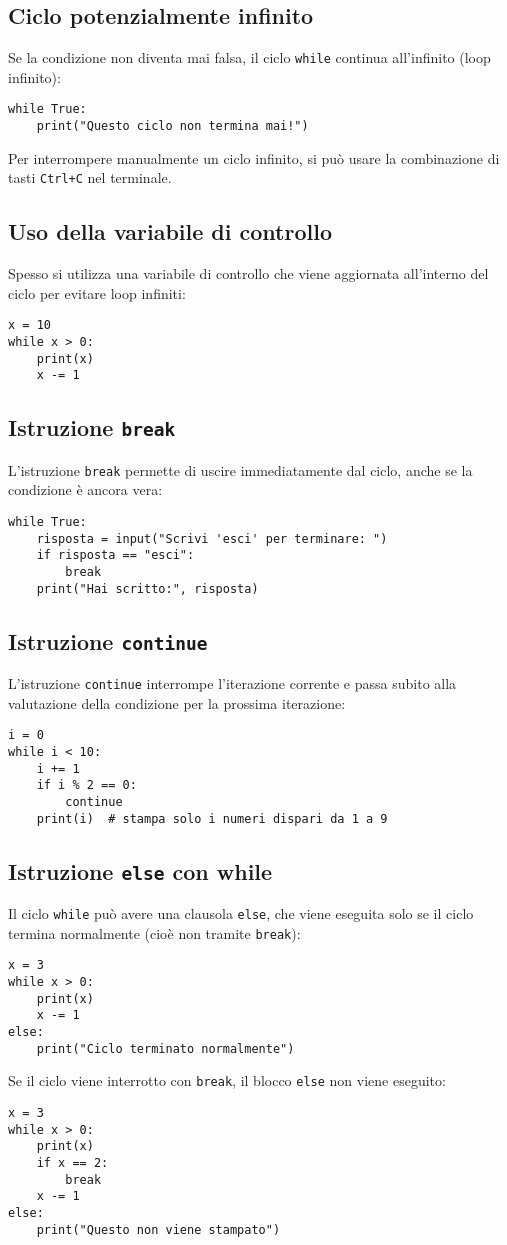 \documentclass[a4paper,12pt]{article}
\begin{document}
\subsection*{Ciclo potenzialmente infinito}
Se la condizione non diventa mai falsa, il ciclo \texttt{while} continua all'infinito (loop infinito):
\begin{lstlisting}
while True:
    print("Questo ciclo non termina mai!")
\end{lstlisting}
Per interrompere manualmente un ciclo infinito, si può usare la combinazione di tasti \texttt{Ctrl+C} nel terminale.

\subsection*{Uso della variabile di controllo}
Spesso si utilizza una variabile di controllo che viene aggiornata all'interno del ciclo per evitare loop infiniti:
\begin{lstlisting}
x = 10
while x > 0:
    print(x)
    x -= 1
\end{lstlisting}

\subsection*{Istruzione \texttt{break}}
L'istruzione \texttt{break} permette di uscire immediatamente dal ciclo, anche se la condizione è ancora vera:
\begin{lstlisting}
while True:
    risposta = input("Scrivi 'esci' per terminare: ")
    if risposta == "esci":
        break
    print("Hai scritto:", risposta)
\end{lstlisting}

\subsection*{Istruzione \texttt{continue}}
L'istruzione \texttt{continue} interrompe l'iterazione corrente e passa subito alla valutazione della condizione per la prossima iterazione:
\begin{lstlisting}
i = 0
while i < 10:
    i += 1
    if i % 2 == 0:
        continue
    print(i)  # stampa solo i numeri dispari da 1 a 9
\end{lstlisting}

\subsection*{Istruzione \texttt{else} con while}
Il ciclo \texttt{while} può avere una clausola \texttt{else}, che viene eseguita solo se il ciclo termina normalmente (cioè non tramite \texttt{break}):
\begin{lstlisting}
x = 3
while x > 0:
    print(x)
    x -= 1
else:
    print("Ciclo terminato normalmente")
\end{lstlisting}
Se il ciclo viene interrotto con \texttt{break}, il blocco \texttt{else} non viene eseguito:
\begin{lstlisting}
x = 3
while x > 0:
    print(x)
    if x == 2:
        break
    x -= 1
else:
    print("Questo non viene stampato")
\end{lstlisting}
\end{document}
